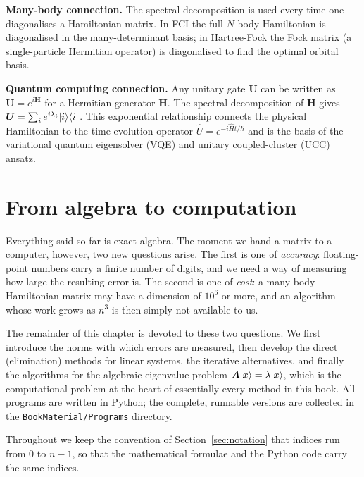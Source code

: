 \begin{notebox}
\textbf{Many-body connection.} The spectral decomposition is used
every time one diagonalises a Hamiltonian matrix.  In FCI the full
$N$-body Hamiltonian is diagonalised in the many-determinant basis;
in Hartree-Fock the Fock matrix (a single-particle Hermitian operator)
is diagonalised to find the optimal orbital basis.

\textbf{Quantum computing connection.} Any unitary gate $\bm{U}$ can
be written as $\bm{U}=e^{i\bm{H}}$ for a Hermitian generator $\bm{H}$.
The spectral decomposition of $\bm{H}$ gives
$\bm{U}=\sum_i e^{i\lambda_i}\vert i \rangle\langle i \vert$.
This exponential relationship connects the physical Hamiltonian to the
time-evolution operator $\hat{U}=e^{-i\hat{H}t/\hbar}$ and is the
basis of the variational quantum eigensolver (VQE) and unitary
coupled-cluster (UCC) ansatz.
\end{notebox}


\section{From algebra to computation}
\label{sec:fromalgebra}

Everything said so far is exact algebra.  The moment we hand a matrix to a
computer, however, two new questions arise.  The first is one of
\emph{accuracy}: floating-point numbers carry a finite number of digits, and
we need a way of measuring how large the resulting error is.  The second is
one of \emph{cost}: a many-body Hamiltonian matrix may have a dimension of
$10^6$ or more, and an algorithm whose work grows as $n^3$ is then simply not
available to us.

The remainder of this chapter is devoted to these two questions.  We first
introduce the norms with which errors are measured, then develop the direct
(elimination) methods for linear systems, the iterative alternatives, and
finally the algorithms for the algebraic eigenvalue problem
$\bm{A}\vert x \rangle=\lambda\vert x \rangle$, which is the computational problem at the
heart of essentially every method in this book.  All programs are written in
Python; the complete, runnable versions are collected in the
\texttt{BookMaterial/Programs} directory.

Throughout we keep the convention of Section~\ref{sec:notation} that indices
run from $0$ to $n-1$, so that the mathematical formulae and the Python code
carry the same indices.

